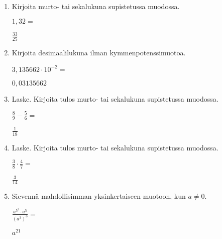 \documentclass[finnish, a4paper, 12pt]{article}
\begin{document}
	\begin{enumerate}[leftmargin=*]
		\setlength\itemsep{1em}
		
		\item %
		Kirjoita murto- tai sekalukuna supistetussa muodossa. 
		
		\(
		1{,}32 = 
		\) %
		
		\begin{version:withAnswers}
		\( \frac{33}{25} \)
		\end{version:withAnswers}

		\vspace{8pt}
		
		\item %
		Kirjoita desimaalilukuna ilman kymmenpotenssimuotoa. 
		
		\(
		3{,}135662\cdot 10^{-2} = 
		\) %
		\begin{version:withAnswers}
		\( 0,03135662 \)
		\end{version:withAnswers}	
		\vspace{8pt}
		
		\item %
		Laske. Kirjoita tulos murto- tai sekalukuna supistetussa muodossa.
		
		\(
		\displaystyle
		\frac{8}{9}-\frac{5}{6} = 
		\) %
		\begin{version:withAnswers}
		\( \frac{1}{18} \)
		\end{version:withAnswers}	
		
		\vspace{8pt}
		
		\item %
		Laske. Kirjoita tulos murto- tai sekalukuna supistetussa muodossa.
		
		\(
		\displaystyle
		\frac{3}{8}\cdot\frac{4}{7} = 
		\) %
		\begin{version:withAnswers}
		\( \frac{3}{14} \)
		\end{version:withAnswers}
		
		\vspace{8pt}
		
		\item %
		Sievennä mahdollisimman yksinkertaiseen muotoon, kun \(a \not = 0\). 
		
		\(
		\displaystyle
		\frac{a^{5^2}\cdot a^5}{\left(a^3\right)^3} =
		\phantom{mmmmmmmmmmmmmmm}
		\) %
		\begin{version:withAnswers}
		\(  a^{21} \)
		\end{version:withAnswers}
		

\end{enumerate}
\end{document}
